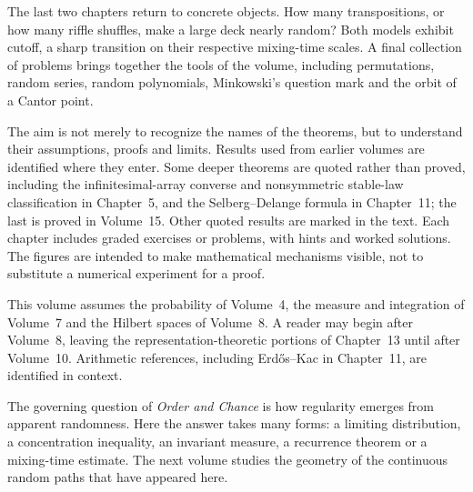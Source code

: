 The last two chapters return to concrete objects. How many transpositions, or how many riffle shuffles, make a large deck nearly random? Both models exhibit cutoff, a sharp transition on their respective mixing-time scales. A final collection of problems brings together the tools of the volume, including permutations, random series, random polynomials, Minkowski's question mark and the orbit of a Cantor point.

The aim is not merely to recognize the names of the theorems, but to understand their assumptions, proofs and limits. Results used from earlier volumes are identified where they enter. Some deeper theorems are quoted rather than proved, including the infinitesimal-array converse and nonsymmetric stable-law classification in Chapter~5, and the Selberg--Delange formula in Chapter~11; the last is proved in Volume~15. Other quoted results are marked in the text. Each chapter includes graded exercises or problems, with hints and worked solutions. The figures are intended to make mathematical mechanisms visible, not to substitute a numerical experiment for a proof.

This volume assumes the probability of Volume~4, the measure and integration of Volume~7 and the Hilbert spaces of Volume~8. A reader may begin after Volume~8, leaving the representation-theoretic portions of Chapter~13 until after Volume~10. Arithmetic references, including Erd\H{o}s--Kac in Chapter~11, are identified in context.

The governing question of \emph{Order and Chance} is how regularity emerges from apparent randomness. Here the answer takes many forms: a limiting distribution, a concentration inequality, an invariant measure, a recurrence theorem or a mixing-time estimate. The next volume studies the geometry of the continuous random paths that have appeared here.
